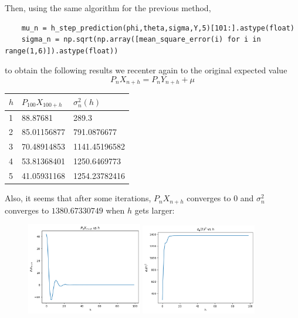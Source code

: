 Then, using the same algorithm for the previous method,
\begin{verbatim}
    mu_n = h_step_prediction(phi,theta,sigma,Y,5)[101:].astype(float)
    sigma_n = np.sqrt(np.array([mean_square_error(i) for i in range(1,6)]).astype(float))
\end{verbatim}
to obtain the following results we recenter again to the original expected value
\[ P_n X_{n+h} = P_n Y_{n+h} + \mu \]
\begin{table}[H]\centering
    \begin{tabular}{l|ll}
    $h$ & $P_{100} X_{100+h}$ & $\sigma_n^2(h)$ \\ \hline
    1 & 88.87681    & 289.3 \\
    2 & 85.01156877 & 791.0876677  \\
    3 & 70.48914853 & 1141.45196582 \\
    4 & 53.81368401 & 1250.6469773 \\
    5 & 41.05931168 & 1254.23782416 \\       
    \end{tabular}
\end{table}

Also, it seems that after some iterations, $P_n X_{n+h}$ converges to $0$ and $\sigma_n^2$ converges to $1380.67330749$ when $h$ gets larger:

\begin{figure}[H]
    \centering
    \includegraphics[width=0.45\textwidth]{../pictures/image2.png}
    \hfill
    \includegraphics[width=0.45\textwidth]{../pictures/image3.png}
\end{figure}

